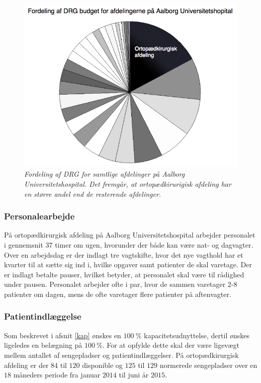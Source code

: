 \begin{figure}[H]
	\centering
	\includegraphics[scale=0.45]{figures/Ortopaeddiagram.png}
	\caption{\textit{Fordeling af DRG for samtlige afdelinger på Aalborg Universitetshospital. Det fremgår, at ortopædkirurigisk afdeling har en større andel end de resterende afdelinger.}\cite{Rasmussen2016}}
	\label{DRG_budget}
\end{figure}


\subsubsection{Personalearbejde} 
På ortopædkirurgisk afdeling på Aalborg Universitetshospital arbejder personalet i gennemsnit 37 timer om ugen\cite{Danske2015}, hvorunder der både kan være nat- og dagvagter. Over en arbejdsdag er der indlagt tre vagtskifte, hvor det nye vagthold har et kvarter til at sætte sig ind i, hvilke opgaver samt patienter de skal varetage. Der er indlagt betalte pauser, hvilket betyder, at personalet skal være til rådighed under pausen. Personalet arbejder ofte i par, hvor de sammen varetager 2-8 patienter om dagen, mens de ofte varetager flere patienter på aftenvagter. 


\subsubsection{Patientindlæggelse} 
Som beskrevet i afsnit \ref{kap} ønskes en $100~\%$ kapacitetsudnyttelse, dertil ønskes ligeledes en belægning på $100~\%$. 
For at opfylde dette skal der være ligevægt mellem antallet af sengepladser og patientindlæggelser. På ortopædkirurgisk afdeling er der $84$ til $120$ disponible og $125$ til $129$ normerede sengepladser over en $18$ måneders periode fra januar $2014$ til juni år $2015$. 

